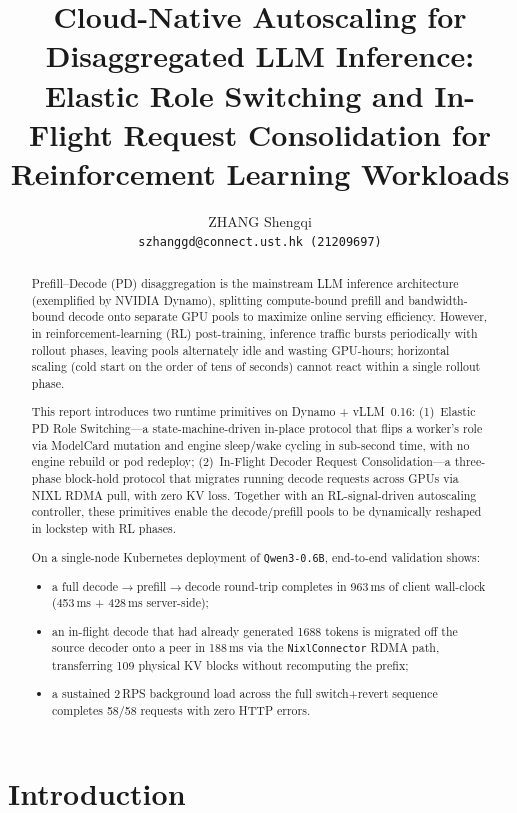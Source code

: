 \documentclass[10pt,twocolumn,letterpaper]{article}
\title{Cloud-Native Autoscaling for Disaggregated LLM Inference:\\Elastic Role Switching and In-Flight Request Consolidation for Reinforcement Learning Workloads}
\author{
ZHANG Shengqi \\
{\tt szhanggd@connect.ust.hk (21209697)} \\
}
\begin{document}
\maketitle

\begin{abstract}
Prefill--Decode (PD) disaggregation is the mainstream LLM inference architecture (exemplified by NVIDIA Dynamo), splitting compute-bound prefill and bandwidth-bound decode onto separate GPU pools to maximize online serving efficiency. However, in reinforcement-learning (RL) post-training, inference traffic bursts periodically with rollout phases, leaving pools alternately idle and wasting GPU-hours; horizontal scaling (cold start on the order of tens of seconds) cannot react within a single rollout phase.

This report introduces two runtime primitives on Dynamo + vLLM~0.16: (1)~Elastic PD Role Switching---a state-machine-driven in-place protocol that flips a worker's role via ModelCard mutation and engine sleep/wake cycling in sub-second time, with no engine rebuild or pod redeploy; (2)~In-Flight Decoder Request Consolidation---a three-phase block-hold protocol that migrates running decode requests across GPUs via NIXL RDMA pull, with zero KV loss. Together with an RL-signal-driven autoscaling controller, these primitives enable the decode/prefill pools to be dynamically reshaped in lockstep with RL phases.

On a single-node Kubernetes deployment of \texttt{Qwen3-0.6B}, end-to-end validation shows:
\begin{itemize}[nosep]
\item a full decode$\to$prefill$\to$decode round-trip completes in 963\,ms of client wall-clock (453\,ms + 428\,ms server-side);
\item an in-flight decode that had already generated 1688 tokens is migrated off the source decoder onto a peer in 188\,ms via the \texttt{NixlConnector} RDMA path, transferring 109 physical KV blocks without recomputing the prefix;
\item a sustained 2\,RPS background load across the full switch+revert sequence completes 58/58 requests with zero HTTP errors.
\end{itemize}
\end{abstract}

\section{Introduction}
\label{sec:intro}
\end{document}

